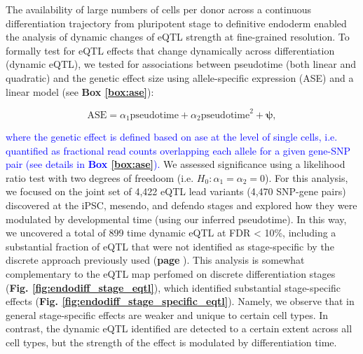The availability of large numbers of cells per donor across a continuous differentiation trajectory from pluripotent stage to definitive endoderm enabled the analysis of dynamic changes of eQTL strength at fine-grained resolution. 
To formally test for eQTL effects that change dynamically across differentiation (dynamic eQTL), we tested for associations between pseudotime (both linear and quadratic) and the genetic effect size using allele-specific expression (ASE) and a linear model (see \textbf{Box \ref{box:ase}}):

\begin{equation}\label{eq:endodiff_ase_pseudotime}
    \mathrm{ASE} = \alpha_1 \mathrm{pseudotime} + \alpha_2 \mathrm{pseudotime}^2 + \boldsymbol{\psi},
\end{equation}

\textcolor{blue}{where the genetic effect is defined based on \gls{ase} at the level of single cells, i.e. quantified as fractional read counts overlapping each allele for a given gene-SNP pair (see details in \textbf{Box \ref{box:ase}}).}
We assessed significance using a likelihood ratio test with two degrees of freedoom (i.e. $H_0: \alpha_1 = \alpha_2 = 0$). 
For this analysis, we focused on the joint set of 4,422 eQTL lead variants (4,470 SNP-gene pairs) discovered at the iPSC, mesendo, and defendo stages and explored how they were modulated by developmental time (using our inferred pseudotime).
In this way, we uncovered a total of 899 time dynamic eQTL at FDR < 10\%, including a substantial fraction of eQTL that were not identified as stage-specific by the discrete approach previously used (\textbf{page \pageref{fig:endodiff_stage_specific_eqtl}}).
This analysis is somewhat complementary to the eQTL map perfomed on discrete differentiation stages (\textbf{Fig. \ref{fig:endodiff_stage_eqtl}}), which identified substantial stage-specific effects (\textbf{Fig. \ref{fig:endodiff_stage_specific_eqtl}}).
Namely, we observe that in general stage-specific effects are weaker and unique to certain cell types.
In contrast, the dynamic eQTL identified are detected to a certain extent across all cell types, but the strength of the effect is modulated by differentiation time. \\

